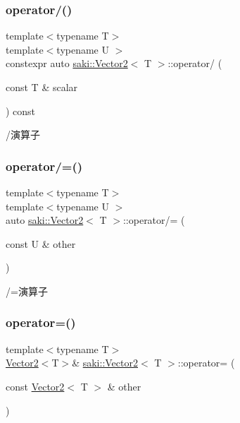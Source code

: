\subsubsection{\texorpdfstring{operator/()}{operator/()}}
{\footnotesize\ttfamily template$<$typename T$>$ \\
template$<$typename U $>$ \\
constexpr auto \mbox{\hyperlink{classsaki_1_1_vector2}{saki\+::\+Vector2}}$<$ T $>$\+::operator/ (\begin{DoxyParamCaption}\item[{const T \&}]{scalar }\end{DoxyParamCaption}) const\hspace{0.3cm}{\ttfamily [inline]}}



/演算子 

\mbox{\label{classsaki_1_1_vector2_a1851ed51c40f0411fe845645a0b87951}} 
\subsubsection{\texorpdfstring{operator/=()}{operator/=()}}
{\footnotesize\ttfamily template$<$typename T$>$ \\
template$<$typename U $>$ \\
auto \mbox{\hyperlink{classsaki_1_1_vector2}{saki\+::\+Vector2}}$<$ T $>$\+::operator/= (\begin{DoxyParamCaption}\item[{const U \&}]{other }\end{DoxyParamCaption})\hspace{0.3cm}{\ttfamily [inline]}}



/=演算子 

\mbox{\label{classsaki_1_1_vector2_a69d8d8afcbdd1a1ae8d290665ec187da}} 
\subsubsection{\texorpdfstring{operator=()}{operator=()}\hspace{0.1cm}{\footnotesize\ttfamily [1/4]}}
{\footnotesize\ttfamily template$<$typename T$>$ \\
\mbox{\hyperlink{classsaki_1_1_vector2}{Vector2}}$<$T$>$\& \mbox{\hyperlink{classsaki_1_1_vector2}{saki\+::\+Vector2}}$<$ T $>$\+::operator= (\begin{DoxyParamCaption}\item[{const \mbox{\hyperlink{classsaki_1_1_vector2}{Vector2}}$<$ T $>$ \&}]{other }\end{DoxyParamCaption})\hspace{0.3cm}{\ttfamily [inline]}}



